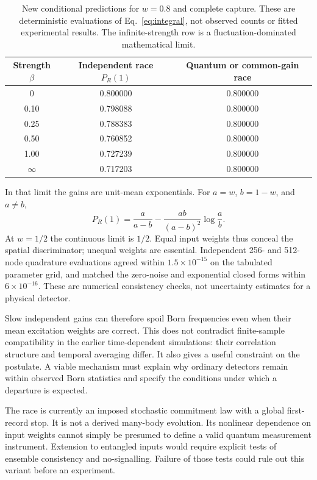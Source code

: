 \documentclass[11pt]{article}
\begin{document}
\begin{table}[ht]
\centering
\begin{tabular}{ccc}
\toprule
Strength $\beta$ & Independent race $P_R(1)$ & Quantum or common-gain race\\
\midrule
0 & 0.800000 & 0.800000\\
0.10 & 0.798088 & 0.800000\\
0.25 & 0.788383 & 0.800000\\
0.50 & 0.760852 & 0.800000\\
1.00 & 0.727239 & 0.800000\\
$\infty$ & 0.717203 & 0.800000\\
\bottomrule
\end{tabular}
\caption{New conditional predictions for $w=0.8$ and complete capture. These are deterministic evaluations of Eq.~\eqref{eq:integral}, not observed counts or fitted experimental results. The infinite-strength row is a fluctuation-dominated mathematical limit.}
\end{table}

In that limit the gains are unit-mean exponentials. For $a=w$, $b=1-w$, and $a\ne b$,
\begin{equation}
 P_R(1)=\frac{a}{a-b}-\frac{ab}{(a-b)^2}\log\frac{a}{b}.
\end{equation}
At $w=1/2$ the continuous limit is $1/2$. Equal input weights thus conceal the spatial discriminator; unequal weights are essential. Independent 256- and 512-node quadrature evaluations agreed within $1.5\times10^{-15}$ on the tabulated parameter grid, and matched the zero-noise and exponential closed forms within $6\times10^{-16}$. These are numerical consistency checks, not uncertainty estimates for a physical detector.

Slow independent gains can therefore spoil Born frequencies even when their mean excitation weights are correct. This does not contradict finite-sample compatibility in the earlier time-dependent simulations: their correlation structure and temporal averaging differ. It also gives a useful constraint on the postulate. A viable mechanism must explain why ordinary detectors remain within observed Born statistics and specify the conditions under which a departure is expected.

The race is currently an imposed stochastic commitment law with a global first-record stop. It is not a derived many-body evolution. Its nonlinear dependence on input weights cannot simply be presumed to define a valid quantum measurement instrument. Extension to entangled inputs would require explicit tests of ensemble consistency and no-signalling. Failure of those tests could rule out this variant before an experiment.
\end{document}
